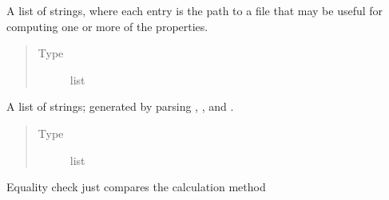 \documentclass[letterpaper,10pt,english]{sphinxmanual}
\begin{document}
\begin{fulllineitems}
\begin{fulllineitems}
\begin{quote}
\begin{description}
\end{description}\end{quote}

\end{fulllineitems}


\begin{fulllineitems}
\label{\detokenize{property_settings:colabfit.tools.property_settings.PropertySettings.files}}
\sphinxAtStartPar
A list of strings, where each entry is the path to a file that may
be useful for computing one or more of the properties.
\begin{quote}\begin{description}
\item[{Type}] \leavevmode
\sphinxAtStartPar
list

\end{description}\end{quote}

\end{fulllineitems}


\begin{fulllineitems}
\label{\detokenize{property_settings:colabfit.tools.property_settings.PropertySettings.labels}}
\sphinxAtStartPar
A list of strings; generated by parsing , , and
.
\begin{quote}\begin{description}
\item[{Type}] \leavevmode
\sphinxAtStartPar
list

\end{description}\end{quote}

\end{fulllineitems}


\begin{fulllineitems}
\label{\detokenize{property_settings:colabfit.tools.property_settings.PropertySettings.__eq__}}
\sphinxAtStartPar
Equality check just compares the calculation method


\end{fulllineitems}
\end{fulllineitems}
\end{document}
